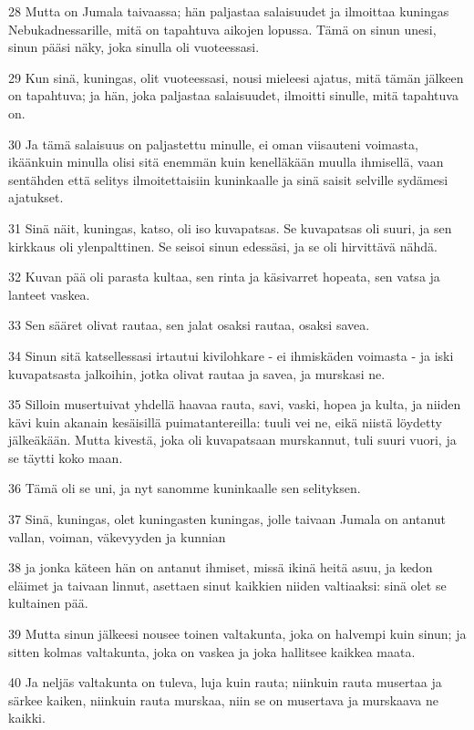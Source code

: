 \par 28 Mutta on Jumala taivaassa; hän paljastaa salaisuudet ja ilmoittaa kuningas Nebukadnessarille, mitä on tapahtuva aikojen lopussa. Tämä on sinun unesi, sinun pääsi näky, joka sinulla oli vuoteessasi.
\par 29 Kun sinä, kuningas, olit vuoteessasi, nousi mieleesi ajatus, mitä tämän jälkeen on tapahtuva; ja hän, joka paljastaa salaisuudet, ilmoitti sinulle, mitä tapahtuva on.
\par 30 Ja tämä salaisuus on paljastettu minulle, ei oman viisauteni voimasta, ikäänkuin minulla olisi sitä enemmän kuin kenelläkään muulla ihmisellä, vaan sentähden että selitys ilmoitettaisiin kuninkaalle ja sinä saisit selville sydämesi ajatukset.
\par 31 Sinä näit, kuningas, katso, oli iso kuvapatsas. Se kuvapatsas oli suuri, ja sen kirkkaus oli ylenpalttinen. Se seisoi sinun edessäsi, ja se oli hirvittävä nähdä.
\par 32 Kuvan pää oli parasta kultaa, sen rinta ja käsivarret hopeata, sen vatsa ja lanteet vaskea.
\par 33 Sen sääret olivat rautaa, sen jalat osaksi rautaa, osaksi savea.
\par 34 Sinun sitä katsellessasi irtautui kivilohkare - ei ihmiskäden voimasta - ja iski kuvapatsasta jalkoihin, jotka olivat rautaa ja savea, ja murskasi ne.
\par 35 Silloin musertuivat yhdellä haavaa rauta, savi, vaski, hopea ja kulta, ja niiden kävi kuin akanain kesäisillä puimatantereilla: tuuli vei ne, eikä niistä löydetty jälkeäkään. Mutta kivestä, joka oli kuvapatsaan murskannut, tuli suuri vuori, ja se täytti koko maan.
\par 36 Tämä oli se uni, ja nyt sanomme kuninkaalle sen selityksen.
\par 37 Sinä, kuningas, olet kuningasten kuningas, jolle taivaan Jumala on antanut vallan, voiman, väkevyyden ja kunnian
\par 38 ja jonka käteen hän on antanut ihmiset, missä ikinä heitä asuu, ja kedon eläimet ja taivaan linnut, asettaen sinut kaikkien niiden valtiaaksi: sinä olet se kultainen pää.
\par 39 Mutta sinun jälkeesi nousee toinen valtakunta, joka on halvempi kuin sinun; ja sitten kolmas valtakunta, joka on vaskea ja joka hallitsee kaikkea maata.
\par 40 Ja neljäs valtakunta on tuleva, luja kuin rauta; niinkuin rauta musertaa ja särkee kaiken, niinkuin rauta murskaa, niin se on musertava ja murskaava ne kaikki.
